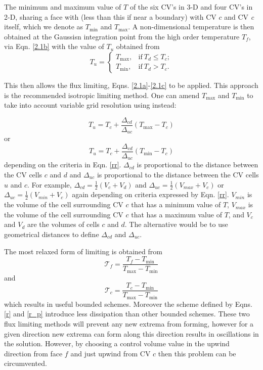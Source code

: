 The minimum and maximum value of $T$ of the six CV's in 3-D and four CV's in 2-D, sharing a face with (less than this if near a boundary) with CV $c$ and CV \textit{c} itself, which we denote as $T_{\min}$ and $T_{\max}$. A non-dimensional temperature is then obtained at the Gaussisn integration point from the high order temperature $T_{f}$, via Eqn. \ref{2.1b} with the value of $T_{u}$ obtained from
\begin{equation}
T_{u} =
\begin{cases}
   T_{\max}, & \text{if} \ T_{d} \leq T_{c}; \\
   T_{\min}, & \text{if} \ T_{d} > T_{c}.
\end{cases}
\label{rr}
\end{equation}

This then allows the flux limiting, Eqns. \ref{2.1a}-\ref{2.1c} to be applied. This approach is the recommended isotropic limiting method.  One can amend $T_{\max}$ and $T_{\min}$ to take into account variable grid resolution using instead:

\begin{equation}
T_u = T_c + \frac{\Delta_{cd}}{\Delta_{uc}} ( T_{\max} - T_c) 
\end{equation}
\noindent
or\\ 
\begin{equation}
T_u = T_c + \frac{\Delta_{cd}}{\Delta_{uc}} ( T_{\min} - T_c) 
\end{equation}
depending on the criteria in Eqn. \ref{rr}. $\Delta_{cd}$ is proportional to the distance between the CV cells $c$ and $d$ and $\Delta_{uc}$ is proportional to the distance between the CV cells $u$ and $c$. For example, $\Delta_{cd} = \frac{1}{2}(V_c + V_d)$ and  $\Delta_{uc} = \frac{1}{2}(V_{max} + V_c)$ or  $\Delta_{uc} = \frac{1}{2}(V_{min} + V_c)$ again  depending on criteria expressed by Eqn. \ref{rr}. $V_{min}$ is the volume of  the cell surrounding CV $c$ that has a minimum value of $T$,  $V_{max}$ is the volume of  the cell surrounding CV $c$ that has a maximum value of $T$, and $V_c$ and $V_d$ are the volumes of cells $c$ and $d$.  The alternative would be to use geometrical distances to define $\Delta_{cd}$ and $\Delta_{uc}$. 

The most relaxed form of limiting is obtained from
\begin{equation}
\mathcal{T}_{f} = \frac{T_{f} - T_{\min}}{T_{\max} - T_{\min}}
\label{r}
\end{equation}
\noindent
and
\begin{equation}
\mathcal{T}_{c} = \frac{T_{c} - T_{\min}}{T_{\max} - T_{\min}}
\label{r_p}
\end{equation}
which results in useful bounded schemes. Moreover the scheme defined by Eqns. \ref{r} and \ref{r_p} introduce less dissipation than other bounded
schemes. These two flux limiting methods will prevent any new extrema from forming, however for a given direction new extrema can form along this direction results in oscillations in the solution. However, by choosing a control volume value in the upwind direction from face $f$ and just upwind from CV $c$ then this problem can be circumvented.


